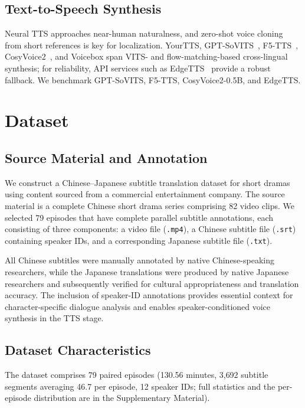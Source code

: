\documentclass[journal]{IEEEtran}
\begin{document}
\subsection{Text-to-Speech Synthesis}
Neural TTS approaches near-human naturalness, and zero-shot voice cloning from short references is key for localization.
YourTTS, GPT-SoVITS~\cite{gptsovits2024}, F5-TTS~\cite{chen2024f5tts}, CosyVoice2~\cite{cosyvoice2_2024}, and Voicebox span VITS- and flow-matching-based cross-lingual synthesis; for reliability, API services such as EdgeTTS~\cite{edgetts2024} provide a robust fallback.
We benchmark GPT-SoVITS, F5-TTS, CosyVoice2-0.5B, and EdgeTTS.

\section{Dataset}
\label{sec:dataset}

\subsection{Source Material and Annotation}
We construct a Chinese--Japanese subtitle translation dataset for short dramas using content sourced from a commercial entertainment company.
The source material is a complete Chinese short drama series comprising 82 video clips.
We selected 79 episodes that have complete parallel subtitle annotations, each consisting of three components: a video file (\texttt{.mp4}), a Chinese subtitle file (\texttt{.srt}) containing speaker IDs, and a corresponding Japanese subtitle file (\texttt{.txt}).

All Chinese subtitles were manually annotated by native Chinese-speaking researchers, while the Japanese translations were produced by native Japanese researchers and subsequently verified for cultural appropriateness and translation accuracy.
The inclusion of speaker-ID annotations provides essential context for character-specific dialogue analysis and enables speaker-conditioned voice synthesis in the TTS stage.

\subsection{Dataset Characteristics}
The dataset comprises 79 paired episodes (130.56 minutes, 3{,}692 subtitle segments averaging 46.7 per episode, 12 speaker IDs; full statistics and the per-episode distribution are in the Supplementary Material).
\end{document}
